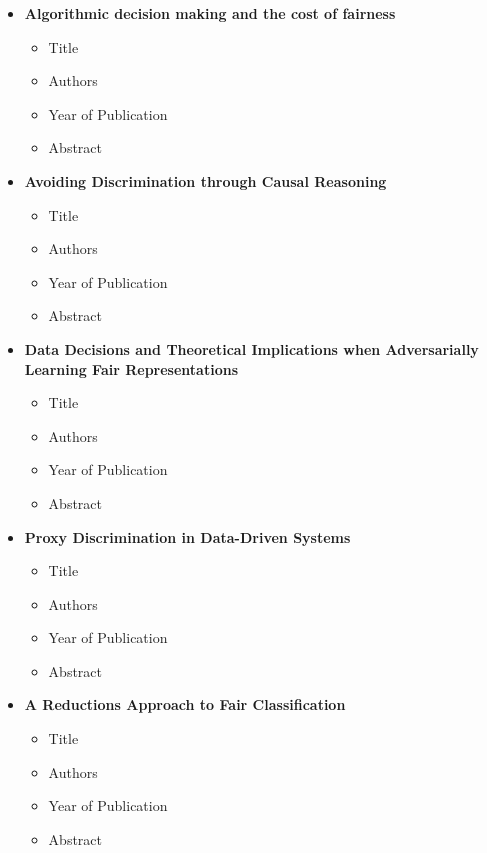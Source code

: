 \documentclass{article}
\begin{document}
\begin{itemize}
        \item \textbf{Algorithmic decision making and the cost of fairness}
        \begin{itemize}
            \item Title
            \item Authors
            \item Year of Publication
            \item Abstract
        \end{itemize}
        
        \item \textbf{Avoiding Discrimination through Causal Reasoning}
        \begin{itemize}
            \item Title
            \item Authors
            \item Year of Publication
            \item Abstract
        \end{itemize}
        
        \item \textbf{Data Decisions and Theoretical Implications when Adversarially Learning Fair Representations}
        \begin{itemize}
            \item Title
            \item Authors
            \item Year of Publication
            \item Abstract
        \end{itemize}
        
        \item \textbf{Proxy Discrimination in Data-Driven Systems}
        \begin{itemize}
            \item Title
            \item Authors
            \item Year of Publication
            \item Abstract
        \end{itemize}
        
        \item \textbf{A Reductions Approach to Fair Classification}
        \begin{itemize}
            \item Title
            \item Authors
            \item Year of Publication
            \item Abstract
        \end{itemize}
        

\end{itemize}
\end{document}
